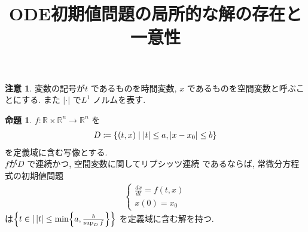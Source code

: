 \documentclass[10pt, fleqn, label-section=none]{bxjsarticle}
\title{ODE初期値問題の局所的な解の存在と一意性}
\date{}
\author{}
\theoremstyle{definition}
\newtheorem{prop}[dfn]{命題}
\newtheorem{remark}[dfn]{注意}
\newcommand{\cbra}[1]{\mleft\{#1\mright\}}
\newcommand{\abs}[1]{\left|#1\right|}
\renewcommand{\;}{\, ; \,}
\begin{document}
\maketitle


\section{}

\begin{remark}
変数の記号が$t$ であるものを時間変数, $x$ であるものを空間変数と呼ぶことにする. また $\abs{\cdot}$ で$L^1$ ノルムを表す. 
\end{remark}

\begin{prop} $f: \mathbb R \times \mathbb R^n \rightarrow \mathbb R^n$ を
\begin{align*} D \coloneqq \cbra{(t,x) \mid \abs t \leq a, \abs{x - x_0} \leq b} \end{align*}
を定義域に含む写像とする. \\
$f$が$D$ で連続かつ, 空間変数に関してリプシッツ連続 であるならば, 常微分方程式の初期値問題
\begin{align*} \begin{cases} \frac{dx}{dt} = f(t,x) \\ x(0) = x_0 \end{cases}\end{align*}
は$\cbra{t \in \mathbb \mid  \abs{t} \leq \min \cbra{a, \frac{b}{\sup_D f }} }$ を定義域に含む解を持つ. 
\end{prop}
\end{document}

